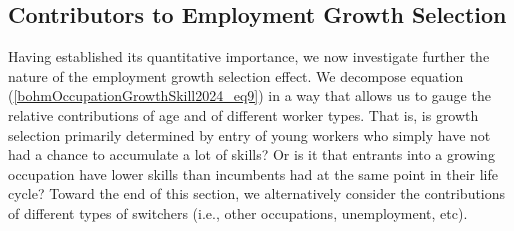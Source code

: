\documentclass[12pt]{article}
\newcommand{\CiteReference}{../reference.bib}
\theoremstyle{definition}
\begin{document}
\subsection{Contributors to Employment Growth Selection}

Having established its quantitative importance, we now investigate further the nature of the employment growth selection effect. We decompose equation (\ref{bohmOccupationGrowthSkill2024_eq9}) in a way that allows us to gauge the relative contributions of age and of different worker types. That is, is growth selection primarily determined by entry of young workers who simply have not had a chance to accumulate a lot of skills? Or is it that entrants into a growing occupation have lower skills than incumbents had at the same point in their life cycle? Toward the end of this section, we alternatively consider the contributions of different types of switchers (i.e., other occupations, unemployment, etc).



 
\end{document}
